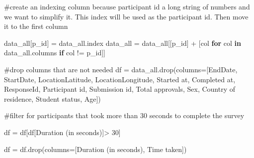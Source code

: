 \documentclass[
  letterpaper,
  DIV=11,
  numbers=noendperiod]{scrartcl}
\newenvironment{Shaded}{\begin{snugshade}}{\end{snugshade}}
\newcommand{\CommentTok}[1]{\textcolor[rgb]{0.37,0.37,0.37}{#1}}
\newcommand{\ControlFlowTok}[1]{\textcolor[rgb]{0.00,0.23,0.31}{\textbf{#1}}}
\newcommand{\DecValTok}[1]{\textcolor[rgb]{0.68,0.00,0.00}{#1}}
\newcommand{\KeywordTok}[1]{\textcolor[rgb]{0.00,0.23,0.31}{\textbf{#1}}}
\newcommand{\NormalTok}[1]{\textcolor[rgb]{0.00,0.23,0.31}{#1}}
\newcommand{\OperatorTok}[1]{\textcolor[rgb]{0.37,0.37,0.37}{#1}}
\newcommand{\StringTok}[1]{\textcolor[rgb]{0.13,0.47,0.30}{#1}}
\begin{document}
\protect{}\label{cleaning-data}
\begin{Shaded}
\begin{Highlighting}[]
\CommentTok{\#create an indexing column because participant id a long string of numbers and we want to simplify it. This index will be used as the participant id. Then move it to the first column}

\NormalTok{data\_all[}\StringTok{\textquotesingle{}p\_id\textquotesingle{}}\NormalTok{] }\OperatorTok{=}\NormalTok{ data\_all.index}
\NormalTok{data\_all }\OperatorTok{=}\NormalTok{ data\_all[[}\StringTok{\textquotesingle{}p\_id\textquotesingle{}}\NormalTok{] }\OperatorTok{+}\NormalTok{ [col }\ControlFlowTok{for}\NormalTok{ col }\KeywordTok{in}\NormalTok{ data\_all.columns }\ControlFlowTok{if}\NormalTok{ col }\OperatorTok{!=} \StringTok{\textquotesingle{}p\_id\textquotesingle{}}\NormalTok{]]}

\CommentTok{\#drop columns that are not needed   }
\NormalTok{df }\OperatorTok{=}\NormalTok{ data\_all.drop(columns}\OperatorTok{=}\NormalTok{[}\StringTok{\textquotesingle{}EndDate\textquotesingle{}}\NormalTok{, }\StringTok{\textquotesingle{}StartDate\textquotesingle{}}\NormalTok{, }\StringTok{\textquotesingle{}LocationLatitude\textquotesingle{}}\NormalTok{, }\StringTok{\textquotesingle{}LocationLongitude\textquotesingle{}}\NormalTok{, }\StringTok{\textquotesingle{}Started at\textquotesingle{}}\NormalTok{, }\StringTok{\textquotesingle{}Completed at\textquotesingle{}}\NormalTok{, }\StringTok{\textquotesingle{}ResponseId\textquotesingle{}}\NormalTok{, }\StringTok{\textquotesingle{}Participant id\textquotesingle{}}\NormalTok{, }\StringTok{\textquotesingle{}Submission id\textquotesingle{}}\NormalTok{, }\StringTok{\textquotesingle{}Total approvals\textquotesingle{}}\NormalTok{, }\StringTok{\textquotesingle{}Sex\textquotesingle{}}\NormalTok{, }\StringTok{\textquotesingle{}Country of residence\textquotesingle{}}\NormalTok{, }\StringTok{\textquotesingle{}Student status\textquotesingle{}}\NormalTok{, }\StringTok{\textquotesingle{}Age\textquotesingle{}}\NormalTok{])}

\CommentTok{\#filter for participants that took more than 30 seconds to complete the survey}

\NormalTok{df }\OperatorTok{=}\NormalTok{ df[df[}\StringTok{\textquotesingle{}Duration (in seconds)\textquotesingle{}}\NormalTok{]}\OperatorTok{\textgreater{}} \DecValTok{30}\NormalTok{]}

\NormalTok{df }\OperatorTok{=}\NormalTok{ df.drop(columns}\OperatorTok{=}\NormalTok{[}\StringTok{\textquotesingle{}Duration (in seconds)\textquotesingle{}}\NormalTok{, }\StringTok{\textquotesingle{}Time taken\textquotesingle{}}\NormalTok{])}
\end{Highlighting}
\end{Shaded}
\end{document}
